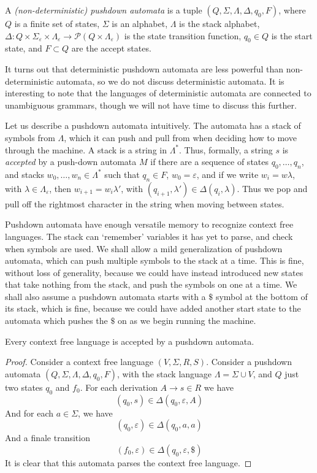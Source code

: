 \begin{definition}
    A \emph{(non-deterministic) pushdown automata} is a tuple $(Q, \Sigma, \Lambda, \Delta, q_0, F)$, where $Q$ is a finite set of states, $\Sigma$ is an alphabet, $\Lambda$ is the stack alphabet, $\Delta: Q \times \Sigma_\varepsilon \times \Lambda_\varepsilon \to \mathcal{P}(Q \times \Lambda_\varepsilon)$ is the state transition function, $q_0 \in Q$ is the start state, and $F \subset Q$ are the accept states.
\end{definition}

It turns out that deterministic pushdown automata are less powerful than non-deterministic automata, so we do not discuss deterministic automata. It is interesting to note that the languages of deterministic automata are connected to unambiguous grammars, though we will not have time to discuss this further.

Let us describe a pushdown automata intuitively. The automata has a stack of symbols from $\Lambda$, which it can push and pull from when deciding how to move through the machine. A stack is a string in $\Lambda^*$. Thus, formally, a string $s$ is \emph{accepted} by a push-down automata $M$ if there are a sequence of states $q_0, \dots, q_n$, and stacks $w_0, \dots, w_n \in \Lambda^*$ such that $q_n \in F$, $w_0 = \varepsilon$, and if we write $w_i = w \lambda$, with $\lambda \in \Lambda_\varepsilon$, then $w_{i+1} = w_i \lambda'$, with $(q_{i+1}, \lambda') \in \Delta(q_i,\lambda)$. Thus we pop and pull off the rightmost character in the string when moving between states.

Pushdown automata have enough versatile memory to recognize context free languages. The stack can `remember' variables it has yet to parse, and check when symbols are used. We shall allow a mild generalization of pushdown automata, which can push multiple symbols to the stack at a time. This is fine, without loss of generality, because we could have instead introduced new states that take nothing from the stack, and push the symbols on one at a time. We shall also assume a pushdown automata starts with a $\$$ symbol at the bottom of its stack, which is fine, because we could have added another start state to the automata which pushes the $\$$ on as we begin running the machine.

\begin{theorem}
    Every context free language is accepted by a pushdown automata.
\end{theorem}
\begin{proof}
    Consider a context free language $(V, \Sigma, R, S)$. Consider a pushdown automata $(Q,\Sigma, \Lambda,\Delta,q_0,F)$, with the stack language $\Lambda = \Sigma \cup V$, and $Q$ just two states $q_0$ and $f_0$. For each derivation $A \rightarrow s \in R$ we have
    \[ (q_0, s) \in \Delta(q_0, \varepsilon, A) \]
    And for each $a \in \Sigma$, we have
    \[ (q_0, \varepsilon) \in \Delta(q_0, a, a) \]
    And a finale transition
    \[ (f_0, \varepsilon) \in \Delta(q_0, \varepsilon, \$) \]
    It is clear that this automata parses the context free language.
\end{proof}

